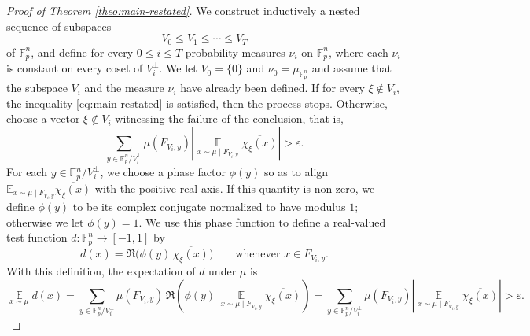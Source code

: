 \documentclass[11pt,reqno]{amsart}
\theoremstyle{plain}
\theoremstyle{remark}
\begin{document}
\begin{proof}[Proof of Theorem \ref{theo:main-restated}]
We construct inductively a nested sequence of subspaces
$$
V_0 \leq V_1 \leq \cdots \leq V_T
$$
of $\mathbb{F}_p^n$, and define for every $0\leq i\leq T$ probability measures $\nu_i$ on $\mathbb{F}_p^n$, where each $\nu_i$ is constant on every coset of $V_i^\perp$. We let $V_0=\{0\}$ and $\nu_0=\mu_{\mathbb{F}_{p}^n}$ and assume that the subspace $V_i$ and the measure $\nu_i$ have already been defined. If for every $\xi\notin V_i$, the inequality \eqref{eq:main-restated} is satisfied, then the process stops. Otherwise, choose a vector $\xi\notin V_i$ witnessing the failure of the conclusion, that is,
$$
\sum_{y\in \mathbb F_p^n/V_i^\perp}
\mu(F_{V_i,y})
\left|
\mathop{\mathbb E}\limits_{x\sim\mu\mid F_{V_i,y}} \overline{\chi_\xi(x)}
\right|
>\varepsilon.
$$
For each $y\in \mathbb F_p^n/V_i^\perp$, we choose a phase factor $\phi(y)$ so as to align
${\mathbb E}_{x\sim\mu\mid F_{V_i,y}} \overline{\chi_\xi(x)}$ with the positive real axis. If this quantity is non-zero, we define $\phi(y)$ to be its complex conjugate normalized to have modulus $1$; otherwise we let $\phi(y)=1$. We use this phase function to define a real-valued test function $d:\mathbb{F}_p^n\to[-1,1]$ by
$$
d(x)=\Re\bigl(\phi(y)\,\overline{\chi_\xi(x)}\bigr)
\qquad\text{whenever }x\in F_{V_i,y}.
$$
With this definition, the expectation of $d$ under $\mu$ is
$$
\mathop{\mathbb E}\limits_{x\sim\mu}d(x)
=
\sum_{y\in \mathbb F_p^n/V_i^\perp}
\mu(F_{V_i,y})\,
\Re\left(
\phi(y)\,
\mathop{\mathbb E}\limits_{x\sim\mu\mid F_{V_i,y}} \overline{\chi_\xi(x)}
\right)
=
\sum_{y\in \mathbb F_p^n/V_i^\perp}
\mu(F_{V_i,y})
\left|
\mathop{\mathbb E}\limits_{x\sim\mu\mid F_{V_i,y}} \overline{\chi_\xi(x)}
\right|
>
\varepsilon.
$$


\end{proof}
\end{document}
